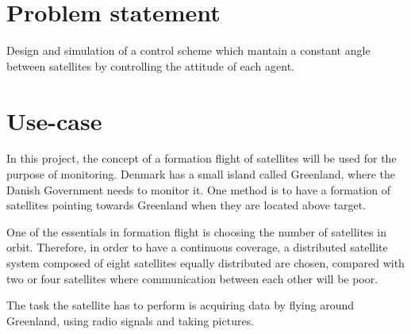 \section{Problem statement}
Design and simulation of a control scheme which mantain a constant angle between satellites by controlling the attitude of each agent.
\section{Use-case}\label{sec:useCase}
In this project, the concept of a formation flight of satellites will be used for the purpose of monitoring. Denmark has a small island called Greenland, where the Danish Government needs to monitor it. One method is to have a formation of satellites pointing towards Greenland when they are located above target.

One of the essentials in formation flight is choosing the number of satellites in orbit. Therefore, in order to have a continuous coverage, a distributed satellite system composed of eight satellites equally distributed are chosen, compared with two or four satellites where communication between each other will be poor.

The task the satellite has to perform is acquiring data by flying around Greenland, using radio signals and taking pictures.

